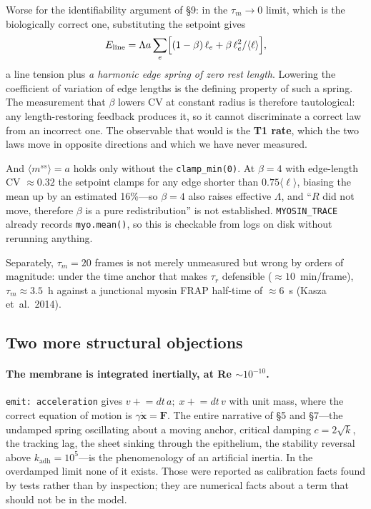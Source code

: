 \documentclass[10pt]{article}
\begin{document}
Worse for the identifiability argument of \S9: in the $\tau_m\to0$ limit, which is the biologically
correct one, substituting the setpoint gives
\[ E_{\text{line}}=\Lambda a\sum_e\Bigl[(1-\beta)\,\ell_e+\beta\,\ell_e^2/\langle\ell\rangle\Bigr], \]
a line tension plus \emph{a harmonic edge spring of zero rest length}. Lowering the coefficient of
variation of edge lengths is the defining property of such a spring. The measurement that $\beta$ lowers
CV at constant radius is therefore tautological: any length-restoring feedback produces it, so it cannot
discriminate a correct law from an incorrect one. The observable that would is the \textbf{T1 rate}, which
the two laws move in opposite directions and which we have never measured.

And $\langle m^{ss}\rangle=a$ holds only without the \texttt{clamp\_min(0)}. At $\beta=4$ with edge-length
CV $\approx0.32$ the setpoint clamps for any edge shorter than $0.75\langle\ell\rangle$, biasing the mean
up by an estimated 16\%---so $\beta=4$ also raises effective $\Lambda$, and ``$R$ did not move, therefore
$\beta$ is a pure redistribution'' is not established. \texttt{MYOSIN\_TRACE} already records
\texttt{myo.mean()}, so this is checkable from logs on disk without rerunning anything.

Separately, $\tau_m=20$ frames is not merely unmeasured but wrong by orders of magnitude: under the time
anchor that makes $\tau_r$ defensible ($\approx10$~min/frame), $\tau_m\approx3.5$~h against a junctional
myosin FRAP half-time of $\approx6$~s (Kasza et~al.\ 2014).

\subsection*{Two more structural objections}

\paragraph{The membrane is integrated inertially, at Re $\sim10^{-10}$.} \texttt{emit: acceleration}
gives $v\mathrel{+}=dt\,a;\;x\mathrel{+}=dt\,v$ with unit mass, where the correct equation of motion is
$\gamma\dot{\mathbf x}=\mathbf F$. The entire narrative of \S5 and \S7---the undamped spring oscillating
about a moving anchor, critical damping $c=2\sqrt k$, the tracking lag, the sheet sinking through the
epithelium, the stability reversal above $k_{\text{adh}}=10^5$---is the phenomenology of an artificial
inertia. In the overdamped limit none of it exists. Those were reported as calibration facts found by
tests rather than by inspection; they are numerical facts about a term that should not be in the model.
\end{document}
